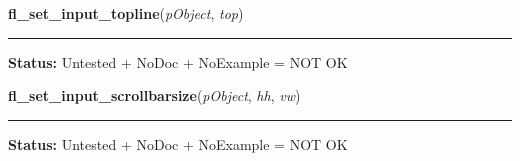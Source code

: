     \label{xformslib:library:fl_set_input_topline}

    \vspace{0.5ex}

\hspace{.8\funcindent}\begin{boxedminipage}{\funcwidth}

    \raggedright \textbf{fl\_set\_input\_topline}(\textit{pObject}, \textit{top})

    \vspace{-1.5ex}

    \rule{\textwidth}{0.5\fboxrule}
\setlength{\parskip}{2ex}
\setlength{\parskip}{1ex}
\textbf{Status:} Untested + NoDoc + NoExample = NOT OK



    \end{boxedminipage}

    \label{xformslib:library:fl_set_input_scrollbarsize}

    \vspace{0.5ex}

\hspace{.8\funcindent}\begin{boxedminipage}{\funcwidth}

    \raggedright \textbf{fl\_set\_input\_scrollbarsize}(\textit{pObject}, \textit{hh}, \textit{vw})

    \vspace{-1.5ex}

    \rule{\textwidth}{0.5\fboxrule}
\setlength{\parskip}{2ex}
\setlength{\parskip}{1ex}
\textbf{Status:} Untested + NoDoc + NoExample = NOT OK



    \end{boxedminipage}

    \label{xformslib:library:fl_get_input_scrollbarsize}

    \vspace{0.5ex}

